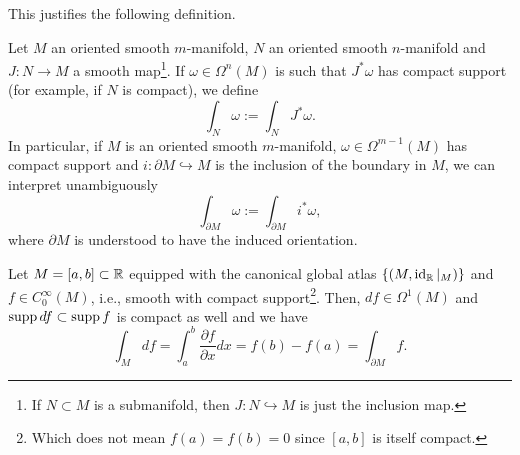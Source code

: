 This justifies the following definition.

\begin{definition}\label{def:insm}
	Let $M$ an oriented smooth $m$-manifold, $N$ an oriented smooth $n$-manifold and $J:N\to M$ a smooth map\footnote{If $N\subset M$ is a submanifold, then $J:N\hookrightarrow M$ is just the inclusion map.}.
	If $\omega\in\Omega^n(M)$ is such that $J^*\omega$ has compact support (for example, if $N$ is compact), we define
	\begin{equation}
		\int_N \omega := \int_N J^*\omega.
	\end{equation}
	In particular, if $M$ is an oriented smooth $m$-manifold, $\omega\in\Omega^{m-1}(M)$ has compact support and $i:\partial M\hookrightarrow M$ is the inclusion of the boundary in $M$, we can interpret unambiguously
	\begin{equation}
		\int_{\partial M} \omega := \int_{\partial M} i^* \omega,
	\end{equation}
	where $\partial M$ is understood to have the induced orientation.
\end{definition}

\begin{example}\label{ex:intint}
	Let $M=[a,b]\subset \mathbb{R}$ equipped with the canonical global atlas $\{(M, \operatorname{id}_{\mathbb{R}}|_M)\}$ and $f\in C^\infty_0(M)$, i.e., smooth with compact support\footnote{Which does not mean $f(a) = f(b)=0$ since $[a,b]$ is itself compact.}.
	Then, $df\in\Omega^1(M)$ and $\operatorname{supp} df \subset \operatorname{supp} f$ is compact as well and we have
	\begin{equation}
		\int_M df = \int_a^b \frac{\partial f}{\partial x} dx = f(b)- f(a) = \int_{\partial M} f.
	\end{equation}
\end{example}

